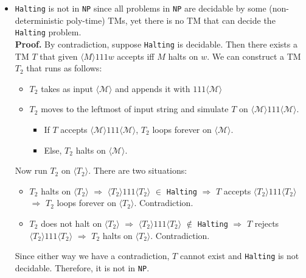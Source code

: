 \documentclass[12pt]{article}
\newcommand{\code}{\texttt}
\begin{document}
\begin{itemize}
  \item \code{Halting} is not in \code{NP} since all problems in \code{NP} are decidable by some (non-deterministic poly-time) TMs, yet there is no TM that can decide the \code{Halting} problem.\\
  \textbf{Proof.} By contradiction, suppose \code{Halting} is decidable. Then there exists a TM \(T\) that given \(\langle M \rangle 111 w\) accepts iff \(M\) halts on \(w\). We can construct a TM \(T_2\) that runs as follows:
  \begin{itemize}
    \item \(T_2\) takes as input \(\langle \mathcal{M} \rangle\) and appends it with \(111 \langle \mathcal{M} \rangle\)
    \item \(T_2\) moves to the leftmost of input string and simulate \(T\) on \(\langle \mathcal{M} \rangle 111 \langle \mathcal{M} \rangle\).
    \begin{itemize}
      \item If \(T\) accepts \(\langle \mathcal{M} \rangle 111 \langle \mathcal{M} \rangle\), \(T_2\) loops forever on \(\langle \mathcal{M} \rangle\).
      \item Else, \(T_2\) halts on \(\langle \mathcal{M} \rangle\).
    \end{itemize}
  \end{itemize}
  Now run \(T_2\) on \(\langle T_2 \rangle\). There are two situations:
  \begin{itemize}
    \item \(T_2\) halts on \(\langle T_2 \rangle\) \(\Rightarrow\)  \(\langle T_2 \rangle 111 \langle T_2 \rangle\) \(\in\) \code{Halting} \(\Rightarrow\) \(T\) accepts \(\langle T_2 \rangle 111 \langle T_2 \rangle\) \(\Rightarrow\) \(T_2\) loops forever on \(\langle T_2 \rangle\). Contradiction.
    \item \(T_2\) does not halt on \(\langle T_2 \rangle\) \(\Rightarrow\) \(\langle T_2 \rangle 111 \langle T_2 \rangle\) \(\notin\) \code{Halting} \(\Rightarrow\) \(T\) rejects \(\langle T_2 \rangle 111 \langle T_2 \rangle\) \(\Rightarrow\) \(T_2\) halts on \(\langle T_2 \rangle\). Contradiction.
  \end{itemize}
  Since either way we have a contradiction, \(T\) cannot exist and \code{Halting} is not decidable. Therefore, it is not in \code{NP}.
\end{itemize}
\end{document}
